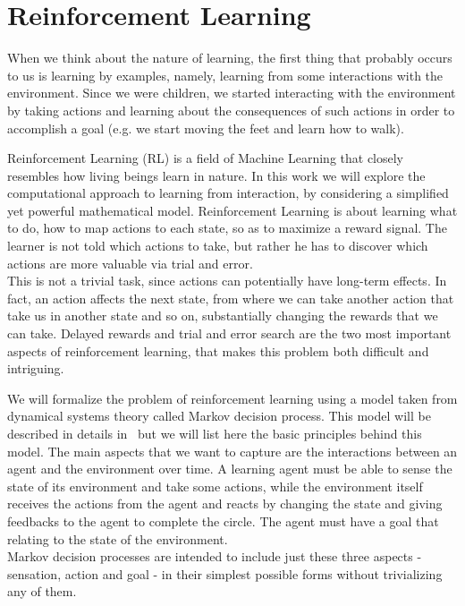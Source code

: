 \chapter{Reinforcement Learning}
\label{ch:rl}
\thispagestyle{empty}

When we think about the nature of learning, the first thing that probably occurs to us is learning by examples, namely, learning from some interactions with the environment. Since we were children, we started interacting with the environment by taking actions and learning about the consequences of such actions in order to accomplish a goal (e.g. we start moving the feet and learn how to walk). 


Reinforcement Learning (RL) is a field of Machine Learning that closely resembles how living beings learn in nature. In this work we will explore the computational approach to learning from interaction, by considering a simplified yet powerful mathematical model. Reinforcement Learning is about learning what to do, how to map actions to each state, so as to maximize a reward signal. The learner is not told which actions to take, but rather he has to discover which actions are more valuable via trial and error. \\
This is not a trivial task, since actions can potentially have long-term effects. In fact, an action affects the next state, from where we can take another action that take us in another state and so on, substantially changing the rewards that we can take. Delayed rewards and trial and error search are the two most important aspects of reinforcement learning, that makes this problem both difficult and intriguing.

We will formalize the problem of reinforcement learning using a model taken from dynamical systems theory called Markov decision process. This model will be described in details in~ but we will list here the basic principles behind this model. The main aspects that we want to capture are the interactions between an agent and the environment over time. A learning agent must be able to sense the state of its environment and take some actions, while the environment itself receives the actions from the agent and reacts by changing the state and giving feedbacks to the agent to complete the circle.
The agent must have a goal that relating to the state of the environment.\\
Markov decision processes are intended to include just these three aspects - sensation, action and goal - in their simplest possible forms without trivializing any of them.

